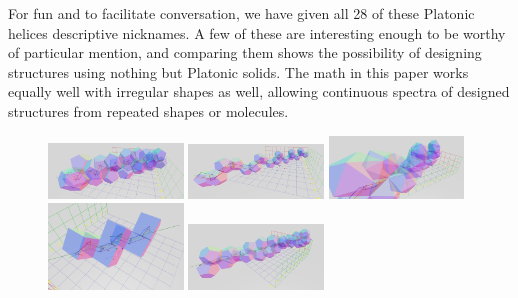 \documentclass{svproc}
\begin{document}
For fun and to facilitate conversation, we have given all
28 of these Platonic helices descriptive nicknames.
A few of these are interesting enough
to be worthy of particular mention, and comparing them
shows the possibility of designing structures using nothing but Platonic solids.
The math in this paper works equally well with irregular shapes as well,
allowing continuous spectra of designed structures from repeated shapes
or molecules.
\begin{figure}
  \centering
{}
{       \includegraphics[width=0.32\textwidth, height=0.15\textwidth]{figures/Dodecashaft.png}}
{       \includegraphics[width=0.32\textwidth, height=0.15\textwidth]{figures/Dodecacorkscrew.png}}
{            \includegraphics[width=0.32\textwidth, height=0.15\textwidth]{figures/TwoStrands.png}}
{       \includegraphics[width=0.32\textwidth, height=0.15\textwidth]{figures/Blockhelix.png}}
{       \includegraphics[width=0.32\textwidth, height=0.15\textwidth]{figures/Dodecadoubler.png}}

\end{figure}
\end{document}
